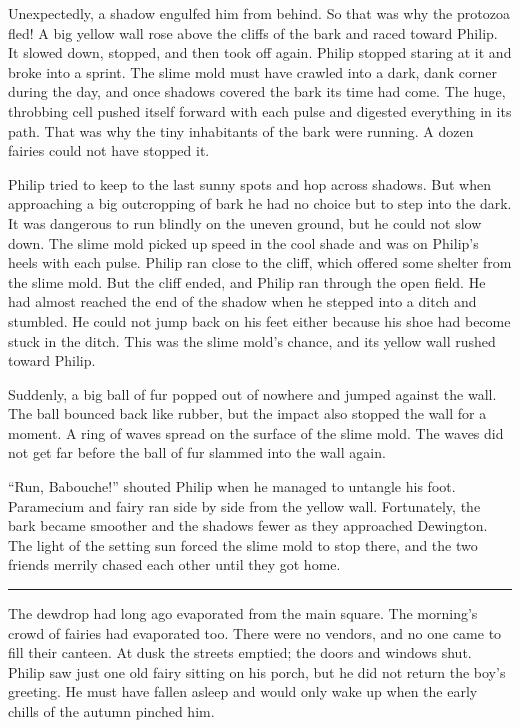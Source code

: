 \documentclass[10pt]{memoir}
\renewcommand{\pfbreakdisplay}{\bigskip \ding{166} \bigskip}
\newcommand{\secbreak}{\fancybreak{\pfbreakdisplay}}
\begin{document}
Unexpectedly, a shadow engulfed him from behind. So that was why the protozoa
fled! A big yellow wall rose above the cliffs of the bark and raced toward
Philip. It slowed down, stopped, and then took off again. Philip stopped
staring at it and broke into a sprint. The slime mold must have crawled into a
dark, dank corner during the day, and once shadows covered the bark its time
had come. The huge, throbbing cell pushed itself forward with each pulse and
digested everything in its path. That was why the tiny inhabitants of the bark
were running. A dozen fairies could not have stopped it.

Philip tried to keep to the last sunny spots and hop across shadows. But when
approaching a big outcropping of bark he had no choice but to step into the
dark. It was dangerous to run blindly on the uneven ground, but he could not
slow down. The slime mold picked up speed in the cool shade and was on Philip's
heels with each pulse. Philip ran close to the cliff, which offered some
shelter from the slime mold. But the cliff ended, and Philip ran through the
open field. He had almost reached the end of the shadow when he stepped into a
ditch and stumbled. He could not jump back on his feet either because his shoe
had become stuck in the ditch. This was the slime mold's chance, and its yellow
wall rushed toward Philip.

Suddenly, a big ball of fur popped out of nowhere and jumped against the wall.
The ball bounced back like rubber, but the impact also stopped the wall for a
moment. A ring of waves spread on the surface of the slime mold. The waves
did not get far before the ball of fur slammed into the wall again.

``Run, Babouche!'' shouted Philip when he managed to untangle his foot.
Paramecium and fairy ran side by side from the yellow wall. Fortunately, the
bark became smoother and the shadows fewer as they approached Dewington. The
light of the setting sun forced the slime mold to stop there, and the two
friends merrily chased each other until they got home.

\secbreak

The dewdrop had long ago evaporated from the main square. The morning's crowd
of fairies had evaporated too. There were no vendors, and no one came to fill
their canteen. At dusk the streets emptied; the doors and windows shut. Philip
saw just one old fairy sitting on his porch, but he did not return the boy's
greeting. He must have fallen asleep and would only wake up when the early
chills of the autumn pinched him.
\end{document}

